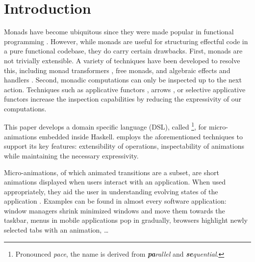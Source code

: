 \section{Introduction}
\label{sec:intro}

Monads have become ubiquitous since they were made popular in functional programming \cite{DBLP:conf/lfp/Wadler90}. However, while monads are useful for structuring effectful code in a pure functional codebase, they do carry certain drawbacks. First, monads are not trivially extensible. A variety of techniques have been developed to resolve this, including monad transformers \cite{DBLP:conf/popl/LiangHJ95}, free monads, and algebraic effects and handlers \cite{DBLP:conf/esop/PlotkinP09}. Second, monadic computations can only be inspected up to the next action. Techniques such as applicative functors \cite{DBLP:journals/jfp/McbrideP08}, arrows \cite{DBLP:journals/scp/Hughes00}, or selective applicative functors increase the inspection capabilities by reducing the expressivity of our computations.

This paper develops a domain specific language (DSL), called \dsl{}\footnote{Pronounced \textit{pace}, the name is derived from \textit{\textbf{pa}rallel} and \textit{\textbf{se}quential}.}, for micro-animations embedded inside Haskell. \dsl{} employs the aforementioned techniques to support its key features: extensibility of operations, inspectability of animations while maintaining the necessary expressivity.

Micro-animations, of which animated transitions are a subset, are short animations displayed when users interact with an application. When used appropriately, they aid the user in understanding evolving states of the application \cite{DBLP:conf/infovis/BedersonB99} \cite{DBLP:conf/chi/Gonzalez96} \cite{DBLP:journals/tvcg/HeerR07}. Examples can be found in almost every software application: window managers shrink minimized windows and move them towards the taskbar, menus in mobile applications pop in gradually, browsers highlight newly selected tabs with an animation, \ldots

